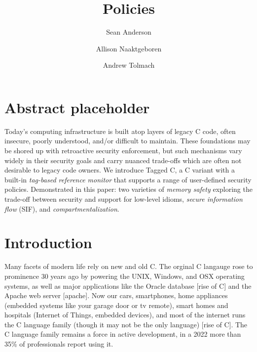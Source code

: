\documentclass[acmsmall,review,anonymous]{acmart}\settopmatter{printfolios=true,printccs=false,printacmref=false}
\title{Policies}
\author{Sean Anderson}
\affiliation{
  \department{Computer Science}
  \institution{Portland State University}
}
\author{Allison Naaktgeboren}
\affiliation{
  \department{Computer Science}
  \institution{Portland State University}
}
\author{Andrew Tolmach}
\affiliation{
  \department{Computer Science}
  \institution{Portland State University}
}
\begin{document}
\maketitle



\section{Abstract placeholder}
Today's computing infrastructure is built atop layers of legacy C code, often
insecure, poorly understood, and/or difficult to maintain. These foundations may be shored up with retroactive security
enforcement, but such mechanisms vary widely in their security goals and carry nuanced trade-offs which are often 
not desirable to legacy code owners. We introduce Tagged C, a C variant with a built-in
{\em tag-based reference monitor} that supports a range of user-defined security policies.
Demonstrated in this paper: two varieties of {\em memory safety} exploring the trade-off between
security and support for low-level idioms, {\em secure information flow} (SIF),
and {\em compartmentalization}.

\section{Introduction}

%

Many facets of modern life rely on new and old C. The orginal C langauge rose to prominence 30 years ago by powering
the UNIX, Windows, and OSX operating systems,  as well as major applications like the Oracle database [rise of C] 
and the Apache web server [apache]. Now our cars, smartphones, 
home appliances (embedded systems like your garage door or tv remote), smart homes and hospitals (Internet of Things, embedded devices), 
and most of the internet runs the C language family (though it may not be the only language) [rise of C]. 
The C language family remains a force in active development, in a 2022 more 
than 35\% of professionals report using it.
\end{document}
